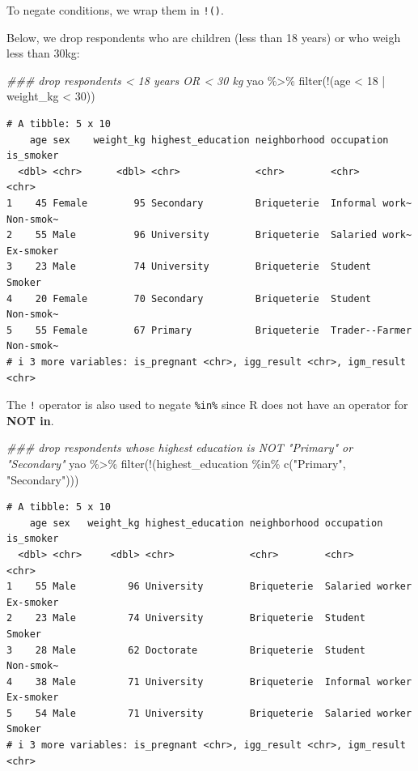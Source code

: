 \documentclass[
  letterpaper,
  DIV=11,
  numbers=noendperiod]{scrreprt}
\newenvironment{Shaded}{\begin{snugshade}}{\end{snugshade}}
\newcommand{\DecValTok}[1]{\textcolor[rgb]{0.68,0.00,0.00}{#1}}
\newcommand{\DocumentationTok}[1]{\textcolor[rgb]{0.37,0.37,0.37}{\textit{#1}}}
\newcommand{\FunctionTok}[1]{\textcolor[rgb]{0.28,0.35,0.67}{#1}}
\newcommand{\NormalTok}[1]{\textcolor[rgb]{0.00,0.23,0.31}{#1}}
\newcommand{\SpecialCharTok}[1]{\textcolor[rgb]{0.37,0.37,0.37}{#1}}
\newcommand{\StringTok}[1]{\textcolor[rgb]{0.13,0.47,0.30}{#1}}
\begin{document}
To negate conditions, we wrap them in \texttt{!()}.

Below, we drop respondents who are children (less than 18 years) or who
weigh less than 30kg:

\begin{Shaded}
\begin{Highlighting}[]
\DocumentationTok{\#\#\# drop respondents \textless{} 18 years OR \textless{} 30 kg}
\NormalTok{yao }\SpecialCharTok{\%\textgreater{}\%} \FunctionTok{filter}\NormalTok{(}\SpecialCharTok{!}\NormalTok{(age }\SpecialCharTok{\textless{}} \DecValTok{18} \SpecialCharTok{|}\NormalTok{ weight\_kg }\SpecialCharTok{\textless{}} \DecValTok{30}\NormalTok{))}
\end{Highlighting}
\end{Shaded}

\begin{verbatim}
# A tibble: 5 x 10
    age sex    weight_kg highest_education neighborhood occupation     is_smoker
  <dbl> <chr>      <dbl> <chr>             <chr>        <chr>          <chr>    
1    45 Female        95 Secondary         Briqueterie  Informal work~ Non-smok~
2    55 Male          96 University        Briqueterie  Salaried work~ Ex-smoker
3    23 Male          74 University        Briqueterie  Student        Smoker   
4    20 Female        70 Secondary         Briqueterie  Student        Non-smok~
5    55 Female        67 Primary           Briqueterie  Trader--Farmer Non-smok~
# i 3 more variables: is_pregnant <chr>, igg_result <chr>, igm_result <chr>
\end{verbatim}

The \texttt{!} operator is also used to negate \texttt{\%in\%} since R
does not have an operator for \textbf{NOT in}.

\begin{Shaded}
\begin{Highlighting}[]
\DocumentationTok{\#\#\# drop respondents whose highest education is NOT "Primary" or "Secondary"}
\NormalTok{yao }\SpecialCharTok{\%\textgreater{}\%} \FunctionTok{filter}\NormalTok{(}\SpecialCharTok{!}\NormalTok{(highest\_education }\SpecialCharTok{\%in\%} \FunctionTok{c}\NormalTok{(}\StringTok{"Primary"}\NormalTok{, }\StringTok{"Secondary"}\NormalTok{)))}
\end{Highlighting}
\end{Shaded}

\begin{verbatim}
# A tibble: 5 x 10
    age sex   weight_kg highest_education neighborhood occupation      is_smoker
  <dbl> <chr>     <dbl> <chr>             <chr>        <chr>           <chr>    
1    55 Male         96 University        Briqueterie  Salaried worker Ex-smoker
2    23 Male         74 University        Briqueterie  Student         Smoker   
3    28 Male         62 Doctorate         Briqueterie  Student         Non-smok~
4    38 Male         71 University        Briqueterie  Informal worker Ex-smoker
5    54 Male         71 University        Briqueterie  Salaried worker Smoker   
# i 3 more variables: is_pregnant <chr>, igg_result <chr>, igm_result <chr>
\end{verbatim}
\end{document}
